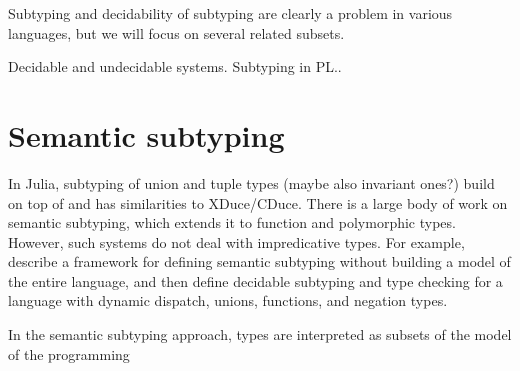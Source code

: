 Subtyping and decidability of subtyping are clearly a problem in various languages,
but we will focus on several related subsets.

Decidable and undecidable systems. Subtyping in PL..

\section{Semantic subtyping}

In Julia, subtyping of union and tuple types (maybe also invariant ones?) build
on top of  and has similarities to XDuce/CDuce.
There is a large body of work on semantic subtyping, which extends it to
function and polymorphic types. However, such systems do not deal with
impredicative types.
For example, \citet{frih:sem-sub:2008} describe a framework for defining semantic
subtyping without building a model of the entire language, and then define
decidable subtyping and type checking for a language with dynamic dispatch,
unions, functions, and negation types.

In the semantic subtyping approach, types are interpreted as subsets of the
model of the programming

